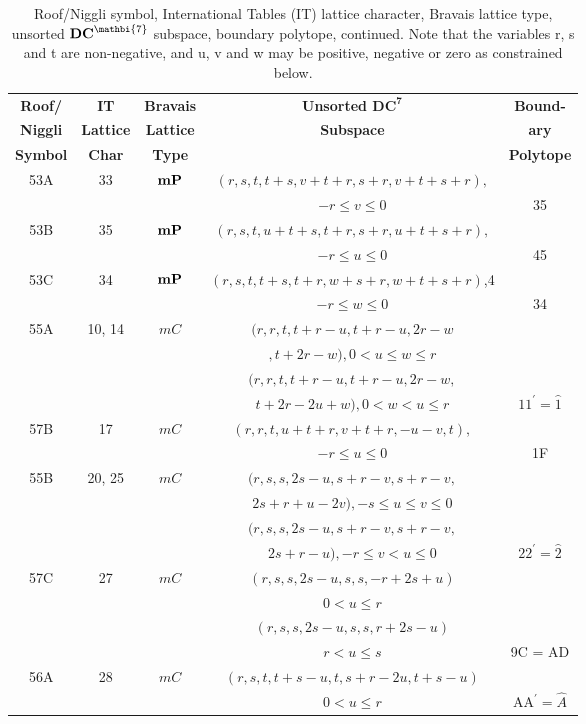 \documentclass[preprint]{iucr}              %
\begin{document}
{\begin{table}
\caption{Roof/Niggli symbol, International Tables (IT) lattice character, Bravais lattice type, unsorted ${\mathbf{DC}^{\mathbi{7}}}$ subspace, boundary polytope, continued.  Note that the variables r, s and t are non-negative, and u, v and w may be
positive, negative or zero as constrained below.}
\begin{center}
\begin{tabular}{|c|c|c|c|c|}
\hline
{\bf Roof/}     &{\bf IT}&{\bf Bravais}&{\bf Unsorted ${\mathbf{DC}^{\mathbf{7}}}$}&{\bf Bound-}\\
{\bf Niggli}&{\bf Lattice}&{\bf Lattice}&{\bf Subspace}&{\bf ary}\\
{\bf Symbol}&{\bf Char}&{\bf Type}&                             & {\bf Polytope} \\
\hline
53A&33&${\bf mP}$&$(r,s,t,t+s,v+t+r,s+r,v+t+s+r),$&\\
&&&$-r \leq v \leq 0$&35\\
53B&35&${\bf mP}$&$(r,s,t,u+t+s,t+r,s+r,u+t+s+r),$&\\
&&&$-r \leq  u \leq 0$&45\\
53C&34&${\bf mP}$&$(r,s,t,t+s,t+r,w+s+r,w+t+s+r)$,4&\\
&&&$-r \leq w \leq 0$&34\\
\hline
55A&10, 14&$mC$&$(r,r,t,t+r-u,t+r-u,2 r-w$&\\
&&&$,t+2r-w), 0 < u \leq w \leq r $&\\
&&&$(r,r,t,t+r-u,t+r-u,2 r-w,$&\\
&&&$t+2 r-2 u +w), 0 < w < u \leq r $&$\text{11}^{\prime} = \hat{1}$\\
57B&17&$mC$&$(r,r,t,u+t+r,v+t+r,-u-v,t),$&\\
&&&$-r \leq u \leq 0$&1F\\
55B&20, 25&$mC$&$(r,s,s,2s-u,s+r-v,s+r-v,$&\\
&&&$2s+r+u-2 v), -s \leq u \leq v \leq 0$&\\
&&&$(r,s,s,2s-u,s+r-v,s+r-v,$&\\
&&&$2s+r-u), -r \leq v < u \leq 0$&$\text{22}^{\prime} = \hat{2}$\\
57C&27&$mC$&$(r,s,s,2s-u,s,s,-r+2s+u)$&\\
&&&$0 < u \leq r$&\\
&&&$(r,s,s,2s-u,s,s,r+2s-u)$&\\
&&&$r < u \leq s$&9C = AD\\
56A&28&$mC$&$(r,s,t,t+s-u,t,s+r-2u,t+s-u)$&\\
&&&$0 < u \leq r$&$\text{AA}^{\prime} = \hat{A}$\\

\end{tabular}
\end{center}
\end{table}}
\end{document}
